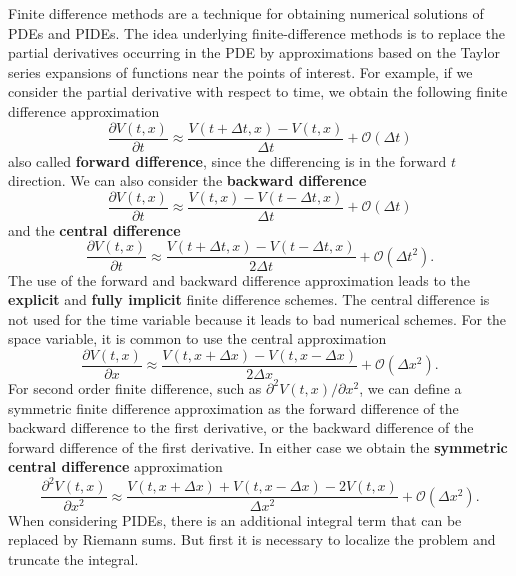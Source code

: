 Finite difference methods are a technique for obtaining numerical solutions of PDEs and PIDEs. 
The idea underlying finite-difference methods is to replace the partial derivatives occurring in the PDE by approximations based on the Taylor series 
expansions of functions near the points of interest.
For example, if we consider the partial derivative with respect to time, we obtain the following finite difference approximation
\begin{equation}
 \frac{\partial V(t,x)}{\partial t} \approx \frac{V(t+\Delta t,x) - V(t,x)}{\Delta t} + \mathcal{O}(\Delta t)
\end{equation}
also called \textbf{forward difference}, since the differencing is in the forward $t$ direction.
We can also consider the \textbf{backward difference}
\begin{equation}
 \frac{\partial V(t,x)}{\partial t} \approx \frac{V(t,x) - V(t-\Delta t,x)}{\Delta t} + \mathcal{O}(\Delta t)
\end{equation}
and the \textbf{central difference}
\begin{equation}
 \frac{\partial V(t,x)}{\partial t} \approx \frac{V(t+\Delta t,x) - V(t-\Delta t,x)}{2 \Delta t} + \mathcal{O}(\Delta t^2).
\end{equation}
The use of the forward and backward difference approximation leads to the \textbf{explicit} and \textbf{fully implicit} finite difference 
schemes. The central difference is not used for the time variable because it leads to bad numerical schemes.
For the space variable, it is common to use the central approximation
\begin{equation}
 \frac{\partial V(t,x)}{\partial x} \approx \frac{V(t,x+\Delta x) - V(t,x-\Delta x)}{2 \Delta x} + \mathcal{O}(\Delta x^2).
\end{equation}
For second order finite difference, such as $\partial^2 V(t,x)/\partial x^2$, we can define a symmetric finite difference approximation as the 
forward difference of the backward difference to the first derivative, or the backward difference of the forward difference of the first derivative. 
In either case we obtain the \textbf{symmetric central difference} approximation
\begin{equation}
 \frac{\partial^2 V(t,x)}{\partial x^2} \approx \frac{V(t,x+\Delta x) + V(t,x-\Delta x) - 2V(t,x)}{ \Delta x^2} + \mathcal{O}(\Delta x^2).
\end{equation}
When considering PIDEs, there is an additional integral term that can be replaced by Riemann sums. But first it is necessary to localize the problem and truncate the integral.

